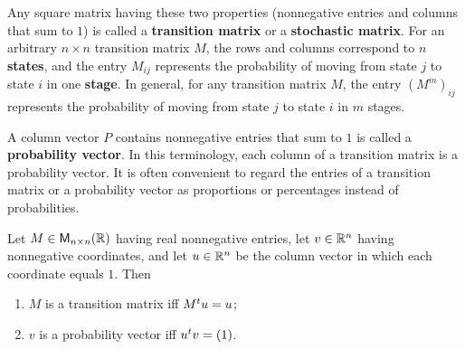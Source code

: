 \begin{defn}\label{5.3.4}
	Any square matrix having these two properties (nonnegative entries and columns that sum to \(1\)) is called a \textbf{transition matrix} or a \textbf{stochastic matrix}.
	For an arbitrary \(n \times n\) transition matrix \(M\), the rows and columns correspond to \(n\) \textbf{states}, and the entry \(M_{i j}\) represents the probability of moving from state \(j\) to state \(i\) in one \textbf{stage}.
	In general, for any transition matrix \(M\), the entry \((M^m)_{i j}\) represents the probability of moving from state \(j\) to state \(i\) in \(m\) stages.

	A column vector \(P\) contains nonnegative entries that sum to \(1\) is called a \textbf{probability vector}.
	In this terminology, each column of a transition matrix is a probability vector.
	It is often convenient to regard the entries of a transition matrix or a probability vector as proportions or percentages instead of probabilities.
\end{defn}

\begin{thm}\label{5.15}
	Let \(M \in \ms[n][n][\R]\) having real nonnegative entries, let \(v \in \mathbb{R}^n\) having nonnegative coordinates, and let \(u \in \mathbb{R}^n\) be the column vector in which each coordinate equals \(1\).
	Then
	\begin{enumerate}
		\item \(M\) is a transition matrix iff \({M}^{t} u = u\);
		\item \(v\) is a probability vector iff \({u}^{t} v = (1)\).
	\end{enumerate}
\end{thm}

